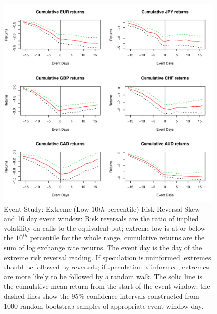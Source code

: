 \documentclass[preprint,12pt,authoryear]{elsarticle}
\begin{document}
\begin{figure}
\graphicspath{{../Figures/}}
\centering
\includegraphics[scale=0.8]{RRCum16a}
\caption{Event Study: Extreme (Low $10{th}$ percentile) Risk Reversal Skew and 16 day event window: Risk reversals are the ratio of implied volatility on calls to the equivalent put; extreme low is at or below the $10^{th}$ percentile for the whole range, cumulative returns are the sum of log exchange rate returns. The event day is the day of the extreme risk reversal reading.  If speculation is uninformed, extremes should be followed by reversals; if speculation is informed, extremes are more likely to be followed by a random walk. The solid line is the cumulative mean return from the start of the event window; the dashed lines show the 95\% confidence intervals constructed from 1000 random bootstrap samples of appropriate event window day.}
\label{fig:ES2}
\end{figure}
\end{document}
